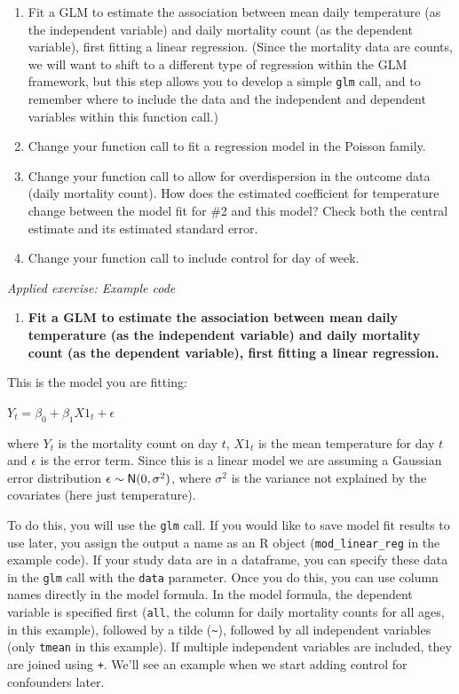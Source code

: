 \documentclass[
]{book}
\providecommand{\tightlist}{%
  \setlength{\itemsep}{0pt}\setlength{\parskip}{0pt}}
\begin{document}
\begin{enumerate}
\def\labelenumi{\arabic{enumi}.}
\tightlist
\item
  Fit a GLM to estimate the association between mean daily temperature (as the
  independent variable) and daily mortality count (as the dependent variable),
  first fitting a linear regression. (Since the mortality data are counts, we will
  want to shift to a different type of regression within the GLM framework, but
  this step allows you to develop a simple \texttt{glm} call, and to remember where to
  include the data and the independent and dependent variables within this
  function call.)
\item
  Change your function call to fit a regression model in the Poisson family.
\item
  Change your function call to allow for overdispersion in the outcome data
  (daily mortality count). How does the estimated coefficient for temperature
  change between the model fit for \#2 and this model? Check both the central
  estimate and its estimated standard error.
\item
  Change your function call to include control for day of week.
\end{enumerate}

\emph{Applied exercise: Example code}

\begin{enumerate}
\def\labelenumi{\arabic{enumi}.}
\tightlist
\item
  \textbf{Fit a GLM to estimate the association between mean daily temperature (as the
  independent variable) and daily mortality count (as the dependent variable),
  first fitting a linear regression.}
\end{enumerate}

This is the model you are fitting:

\(Y_{t}=\beta_{0}+\beta_{1}X1_{t}+\epsilon\)

where \(Y_{t}\) is the mortality count on day \(t\), \(X1_{t}\) is the mean temperature
for day \(t\) and \(\epsilon\) is the error term. Since this is a linear model we are
assuming a Gaussian error distribution \(\epsilon \sim {\sf N}(0, \sigma^{2})\),
where \(\sigma^{2}\) is the variance not explained by the covariates (here just
temperature).

To do this, you will use the \texttt{glm} call. If you would like to save model fit
results to use later, you assign the output a name as an R object
(\texttt{mod\_linear\_reg} in the example code). If your study data are in a dataframe,
you can specify these data in the \texttt{glm} call with the \texttt{data} parameter.
Once you do this, you can use column names directly in the model formula.
In the model formula, the dependent variable is specified first (\texttt{all}, the
column for daily mortality counts for all ages, in this example), followed
by a tilde (\texttt{\textasciitilde{}}), followed by all independent variables (only \texttt{tmean} in this
example). If multiple independent variables are included, they are joined using
\texttt{+}. We'll see an example when we start adding control for confounders later.
\end{document}
